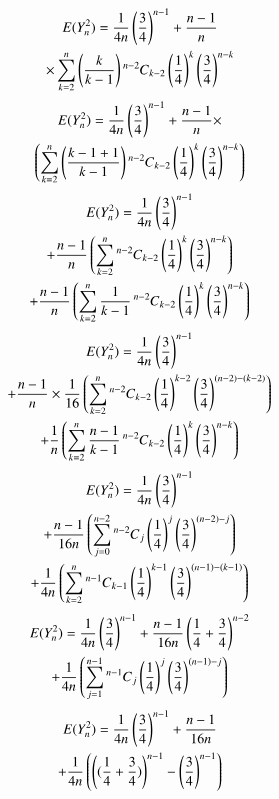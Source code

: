 \documentclass[journal,12pt,twocolumn]{IEEEtran}
\begin{document}
\begin{multline}
   E(Y_n^2) = \frac{1}{4n}\brak{\frac{3}{4}}^{n-1} + \frac{n-1}{n} 
   \\\times\sum_{k=2}^{n} \brak{\frac{k}{k-1}}\comb[n-2]{k-2}\brak{\frac{1}{4}}^{k} \brak{\frac{3}{4}}^{n-k} 
\end{multline}
\begin{multline}
    E(Y_n^2) = \frac{1}{4n}\brak{\frac{3}{4}}^{n-1} + \frac{n-1}{n} \times
   \\\brak{\sum_{k=2}^{n} \brak{\frac{k-1+1}{k-1}}\comb[n-2]{k-2}\brak{\frac{1}{4}}^{k} \brak{\frac{3}{4}}^{n-k} }
\end{multline}
\begin{multline}
    E(Y_n^2) = \frac{1}{4n}\brak{\frac{3}{4}}^{n-1} \\+ \frac{n-1}{n} 
   \brak{\sum_{k=2}^{n}\comb[n-2]{k-2}\brak{\frac{1}{4}}^{k} \brak{\frac{3}{4}}^{n-k} }
   \\+\frac{n-1}{n} \brak{\sum_{k=2}^{n}\frac{1}{k-1}\comb[n-2]{k-2}\brak{\frac{1}{4}}^{k} \brak{\frac{3}{4}}^{n-k} }
\end{multline}   
\begin{multline}
    E(Y_n^2) = \frac{1}{4n}\brak{\frac{3}{4}}^{n-1} \\+ \frac{n-1}{n} \times\frac{1}{16} 
   \brak{\sum_{k=2}^{n}\comb[n-2]{k-2}\brak{\frac{1}{4}}^{k-2} \brak{\frac{3}{4}}^{(n-2)-(k-2)} }
   \\+\frac{1}{n} \brak{\sum_{k=2}^{n}\frac{n-1}{k-1}\comb[n-2]{k-2}\brak{\frac{1}{4}}^{k} \brak{\frac{3}{4}}^{n-k} }
\end{multline}
\begin{multline}
    E(Y_n^2) = \frac{1}{4n}\brak{\frac{3}{4}}^{n-1} \\+ \frac{n-1}{16n} 
   \brak{\sum_{j=0}^{n-2}\comb[n-2]{j}\brak{\frac{1}{4}}^{j} \brak{\frac{3}{4}}^{(n-2)-j} }
   \\+\frac{1}{4n} \brak{\sum_{k=2}^{n}\comb[n-1]{k-1}\brak{\frac{1}{4}}^{k-1} \brak{\frac{3}{4}}^{(n-1)-(k-1)} }
\end{multline}
\begin{multline}
    E(Y_n^2) = \frac{1}{4n}\brak{\frac{3}{4}}^{n-1} + \frac{n-1}{16n}\brak{\frac{1}{4} + \frac{3}{4}}^{n-2}
   \\+\frac{1}{4n} \brak{\sum_{j=1}^{n-1}\comb[n-1]{j}\brak{\frac{1}{4}}^{j} \brak{\frac{3}{4}}^{(n-1)-j} }
\end{multline}
\begin{multline}
    E(Y_n^2) = \frac{1}{4n}\brak{\frac{3}{4}}^{n-1} + \frac{n-1}{16n}
   \\+\frac{1}{4n} \brak{\brak{(\frac{1}{4} + \frac{3}{4})}^{n-1} - \brak{\frac{3}{4}}^{n-1}}
\end{multline}
\end{document}
